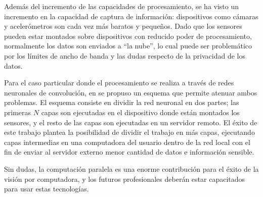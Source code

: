 Además del incremento de las capacidades de procesamiento, se ha visto un
incremento en la capacidad de captura de información: dispositivos como cámaras
y acelerómetros son cada vez más baratos y pequeños. Dado que los sensores
pueden estar montados sobre dispositivos con reducido poder de procesamiento,
normalmente los datos son enviados a ``la nube'', lo cual puede ser problemático
por los límites de ancho de banda y las dudas respecto de la privacidad de los
datos.

Para el caso particular donde el procesamiento se realiza a través de redes
neuronales de convolución, en \cite{pipelinebasedCaffe2017} se propuso un
esquema que permite atenuar ambos problemas. El esquema consiste en dividir la
red neuronal en dos partes; las primeras $N$ capas son ejecutadas en el
dispositivo donde están montados los sensores, y el resto de las capas son
ejecutadas en un servidor remoto. El éxito de este trabajo plantea la
posibilidad de dividir el trabajo en más capas, ejecutando capas intermedias en
una computadora del usuario dentro de la red local con el fin de enviar al
servidor externo menor cantidad de datos e información sensible.

Sin dudas, la computación paralela es una enorme contribución para el éxito de
la visión por computadora, y los futuros profesionales deberán estar capacitados
para usar estas tecnologías.
